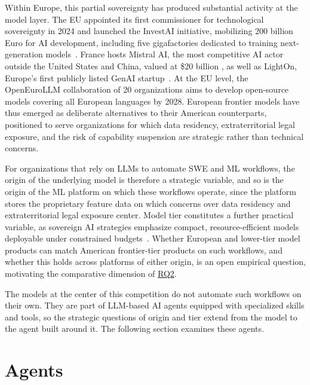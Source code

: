 \documentclass[
english,                 %
bibtex,                  %
]{kththesis}
\numberwithin{listing}{chapter}
\begin{document}
Within Europe, this partial sovereignty has produced substantial activity at the model layer. The \gls{EU} appointed its first commissioner for technological sovereignty in 2024 and launched the Invest\gls{AI} initiative, mobilizing 200 billion Euro for \gls{AI} development, including five gigafactories dedicated to training next-generation models~\cite{dale_sovereign_2025}. France hosts Mistral \gls{AI}, the most competitive \gls{AI} actor outside the United States and China, valued at \$20 billion \cite{sun_frances_2026}, as well as LightOn, Europe's first publicly listed \gls{GenAI} startup~\cite{wang_generative_2025}. At the \gls{EU} level, the OpenEuro\gls{LLM} collaboration of 20 organizations aims to develop open-source models covering all European languages by 2028. European frontier models have thus emerged as deliberate alternatives to their American counterparts, positioned to serve organizations for which data residency, extraterritorial legal exposure, and the risk of capability suspension are strategic rather than technical concerns.

For organizations that rely on \glspl{LLM} to automate \gls{SWE} and \gls{ML} workflows, the origin of the underlying model is therefore a strategic variable, and so is the origin of the \gls{ML} platform on which these workflows operate, since the platform stores the proprietary feature data on which concerns over data residency and extraterritorial legal exposure center. Model tier constitutes a further practical variable, as sovereign \gls{AI} strategies emphasize compact, resource-efficient models deployable under constrained budgets~\cite{andres_perez_strategic_2026}. Whether European and lower-tier model products can match American frontier-tier products on such workflows, and whether this holds across platforms of either origin, is an open empirical question, motivating the comparative dimension of \hyperref[rq2]{RQ2}.

The models at the center of this competition do not automate such workflows on their own. They are part of \gls{LLM}-based \gls{AI} agents equipped with specialized skills and tools, so the strategic questions of origin and tier extend from the model to the agent built around it. The following section examines these agents.

\section{Agents}
\label{sec:bg_agents}
\glsresetall
\end{document}
